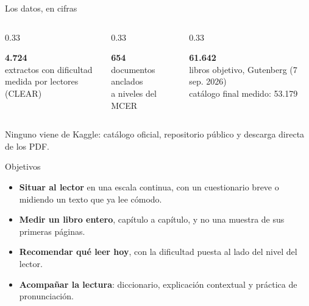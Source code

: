 \documentclass[aspectratio=169,11pt]{beamer}
\newcommand{\cifra}[2]{%
  \begin{minipage}{\linewidth}\centering
    {\fontsize{42}{46}\selectfont\bfseries\color{llazul}#1}\\[4pt]
    {\small\color{llgris}#2}
  \end{minipage}}
\begin{document}
\begin{frame}{Los datos, en cifras}
\vspace{6mm}
\begin{columns}[T]
\begin{column}{0.33\textwidth}\centering
  \cifra{4.724}{extractos con dificultad\\medida por lectores (CLEAR)}
\end{column}
\begin{column}{0.33\textwidth}\centering
  \cifra{654}{documentos anclados\\a niveles del MCER}
\end{column}
\begin{column}{0.33\textwidth}\centering
  \cifra{61.642}{libros objetivo, Gutenberg (7 sep. 2026)\\catálogo final medido: 53.179}
\end{column}
\end{columns}

\vspace{10mm}
\begin{center}\small\color{llgris}
Ninguno viene de Kaggle: catálogo oficial, repositorio público y descarga
directa de los PDF.
\end{center}
\end{frame}

\begin{frame}{Objetivos}
\vspace{4mm}
\begin{itemize}\setlength\itemsep{5mm}
  \item[{\color{llcian}\bfseries 01}] \textbf{Situar al lector} en una escala
        continua, con un cuestionario breve o midiendo un texto que ya lee cómodo.
  \item[{\color{llcian}\bfseries 02}] \textbf{Medir un libro entero}, capítulo
        a capítulo, y no una muestra de sus primeras páginas.
  \item[{\color{llcian}\bfseries 03}] \textbf{Recomendar qué leer hoy}, con la
        dificultad puesta al lado del nivel del lector.
  \item[{\color{llcian}\bfseries 04}] \textbf{Acompañar la lectura}: diccionario,
        explicación contextual y práctica de pronunciación.
\end{itemize}
\end{frame}
\end{document}
